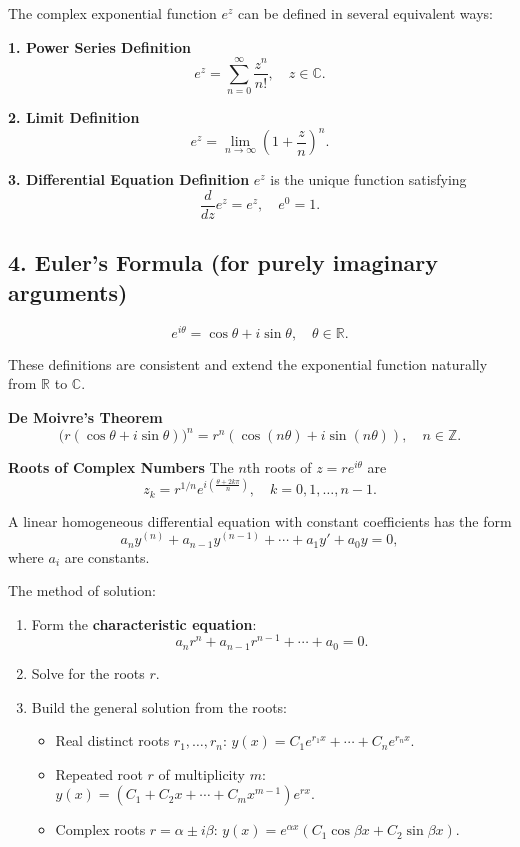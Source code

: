 \begin{highlight}
The complex exponential function $e^z$ can be defined in several equivalent ways:

\textbf{1. Power Series Definition}
\[
e^z = \sum_{n=0}^\infty \frac{z^n}{n!}, \quad z\in\mathbb{C}.
\]

\textbf{2. Limit Definition}
\[
e^z = \lim_{n \to \infty} \left(1 + \frac{z}{n}\right)^n.
\]

\textbf{3. Differential Equation Definition}
$e^z$ is the unique function satisfying
\[
\frac{d}{dz} e^z = e^z, \quad e^0 = 1.
\]

\subsection*{4. Euler’s Formula (for purely imaginary arguments)}
\[
e^{i\theta} = \cos\theta + i\sin\theta, \quad \theta \in \mathbb{R}.
\]

These definitions are consistent and extend the exponential function naturally from $\mathbb{R}$ to $\mathbb{C}$.

\textbf{De Moivre's Theorem}
\[
\big(r(\cos\theta+i\sin\theta)\big)^n = r^n(\cos(n\theta)+i\sin(n\theta)), \quad n \in \mathbb{Z}.
\]

\textbf{Roots of Complex Numbers}
The $n$th roots of $z=re^{i\theta}$ are
\[
z_k = r^{1/n} e^{i\left(\frac{\theta+2k\pi}{n}\right)}, \quad k=0,1,\dots,n-1.
\]
\end{highlight}



A linear homogeneous differential equation with constant coefficients has the form
\[
a_n y^{(n)} + a_{n-1} y^{(n-1)} + \cdots + a_1 y' + a_0 y = 0,
\]
where $a_i$ are constants.

The method of solution:
\begin{enumerate}
    \item Form the \textbf{characteristic equation}:
    \[
      a_n r^n + a_{n-1} r^{n-1} + \cdots + a_0 = 0.
    \]
    \item Solve for the roots $r$.
    \item Build the general solution from the roots:
    \begin{itemize}
        \item Real distinct roots $r_1,\dots,r_n$:  
        $y(x) = C_1 e^{r_1 x} + \cdots + C_n e^{r_n x}$.
        \item Repeated root $r$ of multiplicity $m$:  
        $y(x) = (C_1 + C_2 x + \cdots + C_m x^{m-1}) e^{rx}$.
        \item Complex roots $r=\alpha \pm i\beta$:  
        $y(x) = e^{\alpha x}(C_1\cos \beta x + C_2\sin \beta x)$.
    \end{itemize}
\end{enumerate}



